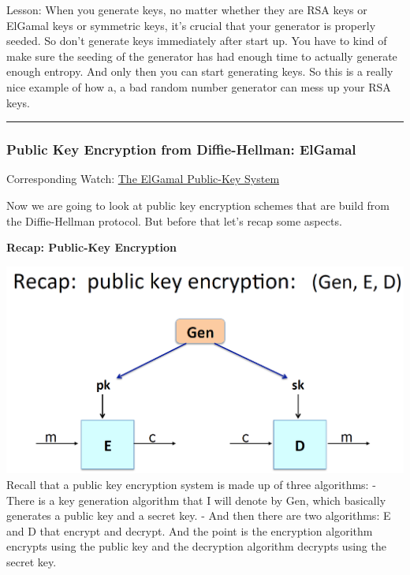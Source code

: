 \documentclass[11pt]{article}
\makeatletter
\def\maxwidth{\ifdim\Gin@nat@width>\linewidth\linewidth
    \else\Gin@nat@width\fi}
\let\Oldincludegraphics\includegraphics
\renewcommand{\includegraphics}[1]{\Oldincludegraphics[width=.8\maxwidth]{#1}}
\makeatother
\begin{document}
Lesson: When you generate keys, no matter whether they are RSA keys or
ElGamal keys or symmetric keys, it's crucial that your generator is
properly seeded. So don't generate keys immediately after start up. You
have to kind of make sure the seeding of the generator has had enough
time to actually generate enough entropy. And only then you can start
generating keys. So this is a really nice example of how a, a bad random
number generator can mess up your RSA keys.

\begin{center}\rule{0.5\linewidth}{\linethickness}\end{center}

    \hypertarget{public-key-encryption-from-diffie-hellman-elgamal}{%
\subsubsection{Public Key Encryption from Diffie-Hellman:
ElGamal}\label{public-key-encryption-from-diffie-hellman-elgamal}}

Corresponding Watch:
\href{https://www.coursera.org/learn/crypto/lecture/ycSSO/the-elgamal-public-key-system}{The
ElGamal Public-Key System}

Now we are going to look at public key encryption schemes that are build
from the Diffie-Hellman protocol. But before that let's recap some
aspects.

\textbf{Recap: Public-Key Encryption}

\includegraphics{./Images/PKEnc-Recap.png} Recall that a public key
encryption system is made up of three algorithms: - There is a key
generation algorithm that I will denote by Gen, which basically
generates a public key and a secret key. - And then there are two
algorithms: E and D that encrypt and decrypt. And the point is the
encryption algorithm encrypts using the public key and the decryption
algorithm decrypts using the secret key.
\end{document}
